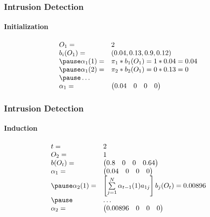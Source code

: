 \documentclass{beamer}
\begin{document}
\begin{frame}
  \frametitle{Intrusion Detection}
  \framesubtitle{Initialization}
  \pause
  $$
  \begin{array}{ll}
    O_1 =& 2 \\
    b_i(O_1) =& (0.04, 0.13, 0.9, 0.12)\\ \pause
    \alpha_1(1) =& \pi_1 * b_1(O_1) = 1 * 0.04 = 0.04 \\ \pause
    \alpha_1(2) =& \pi_2 * b_2(O_1) =0 * 0.13 = 0 \\ \pause
    \ldots \\
    \alpha_1 =& \begin{pmatrix} 0.04 & 0 & 0 & 0\end{pmatrix}
  \end{array}
  $$
\end{frame}
\begin{frame}
  \frametitle{Intrusion Detection}
  \framesubtitle{Induction}
  \pause
  $$
  \begin{array}{ll}
    t= & 2\\
    O_2 =& 1 \\
    b(O_t) =& \begin{pmatrix}0.8& 0& 0& 0.64\end{pmatrix}\\
    \alpha_1 =& \begin{pmatrix} 0.04 & 0 & 0 & 0\end{pmatrix}\\ \pause
    \alpha_2(1) =& \left[ \sum\limits_{j=1}^N\alpha_{t-1}(1)a_{1j}\right] b_j
                   (O_t) = 0.00896 \\ \pause
       & \ldots \\
    \alpha_2 =& \begin{pmatrix} 0.00896 & 0 & 0 & 0\end{pmatrix}\\
  
  \end{array}
  $$
\end{frame}
\end{document}
